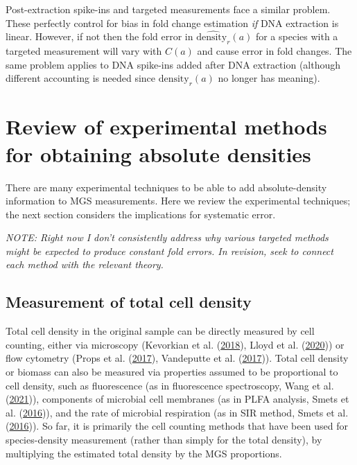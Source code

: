 \documentclass[
]{article}
\begin{document}
Post-extraction spike-ins and targeted measurements face a similar problem.
These perfectly control for bias in fold change estimation \emph{if} DNA extraction is linear.
However, if not then the fold error in \(\widehat{\text{density}_r}(a)\) for a species with a targeted measurement will vary with \(C(a)\) and cause error in fold changes.
The same problem applies to DNA spike-ins added after DNA extraction (although different accounting is needed since \(\text{density}_r(a)\) no longer has meaning).

\hypertarget{review-absolute-methods}{%
\section{Review of experimental methods for obtaining absolute densities}\label{review-absolute-methods}}

There are many experimental techniques to be able to add absolute-density information to MGS measurements.
Here we review the experimental techniques; the next section considers the implications for systematic error.

\emph{NOTE: Right now I don't consistently address why various targeted methods might be expected to produce constant fold errors. In revision, seek to connect each method with the relevant theory.}

\hypertarget{measurement-of-total-cell-density}{%
\subsection{Measurement of total cell density}\label{measurement-of-total-cell-density}}

Total cell density in the original sample can be directly measured by cell counting, either via microscopy (Kevorkian et al. (\protect\hyperlink{ref-kevorkian2018esti}{2018}), Lloyd et al. (\protect\hyperlink{ref-lloyd2020evid}{2020})) or flow cytometry (Props et al. (\protect\hyperlink{ref-props2017abso}{2017}), Vandeputte et al. (\protect\hyperlink{ref-vandeputte2017quan}{2017})).
Total cell density or biomass can also be measured via properties assumed to be proportional to cell density, such as fluorescence (as in fluorescence spectroscopy, Wang et al. (\protect\hyperlink{ref-wang2021curr}{2021})), components of microbial cell membranes (as in PLFA analysis, Smets et al. (\protect\hyperlink{ref-smets2016amet}{2016})), and the rate of microbial respiration (as in SIR method, Smets et al. (\protect\hyperlink{ref-smets2016amet}{2016})).
So far, it is primarily the cell counting methods that have been used for species-density measurement (rather than simply for the total density), by multiplying the estimated total density by the MGS proportions.
\end{document}
